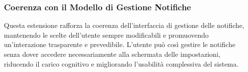 \subsubsection{Coerenza con il Modello di Gestione Notifiche}
Questa estensione rafforza la coerenza dell’interfaccia di gestione delle notifiche, mantenendo le scelte dell’utente sempre modificabili e promuovendo un’interazione trasparente e prevedibile. L’utente può così gestire le notifiche senza dover accedere necessariamente alla schermata delle impostazioni, riducendo il carico cognitivo e migliorando l’usabilità complessiva del sistema.\begin{figure}[ht]
    \centering
\end{figure}
